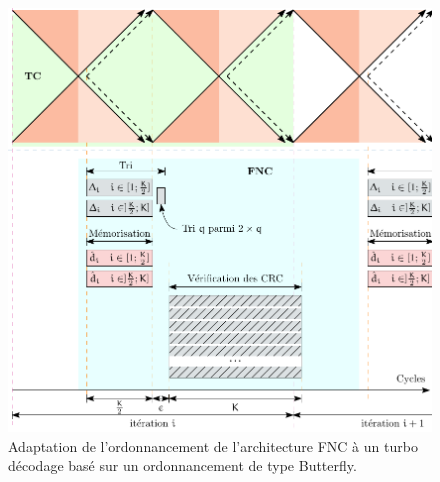 \begin{figure}[!h]
	\centering
	\includegraphics{main/ch4_fig/ipe/fnc_bfly_2.pdf}
	\caption{Adaptation de l'ordonnancement de l'architecture FNC à un turbo décodage basé sur un ordonnancement de 
	type Butterfly. \label{fig:fnc_bfly}}
\end{figure}


